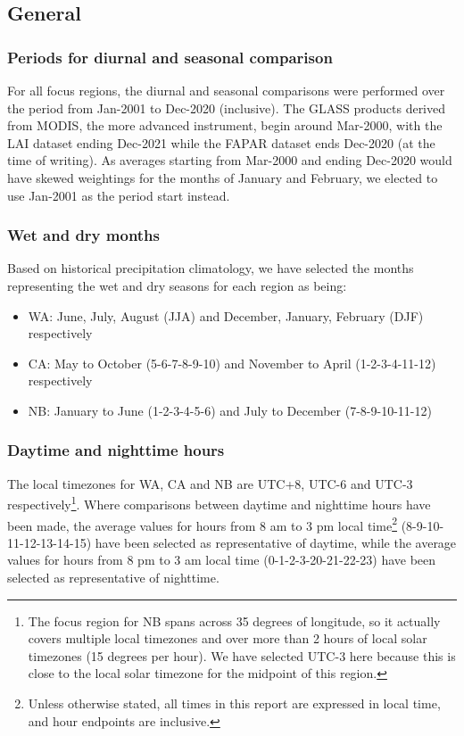 \subsection{General}

\subsubsection{Periods for diurnal and seasonal comparison}

For all focus regions, the diurnal and seasonal comparisons were performed over the period from Jan-2001 to Dec-2020 (inclusive). The GLASS products derived from \ac{MODIS}, the more advanced instrument, begin around Mar-2000, with the \ac{LAI} dataset ending Dec-2021 while the \ac{FAPAR} dataset ends Dec-2020 (at the time of writing). As averages starting from Mar-2000 and ending Dec-2020 would have skewed weightings for the months of January and February, we elected to use Jan-2001 as the period start instead.

\subsubsection{Wet and dry months}

Based on historical precipitation climatology, we have selected the months representing the wet and dry seasons for each region as being:
\begin{itemize}
	\item \ac{WA}: June, July, August (JJA) and December, January, February (DJF) respectively
	\item \ac{CA}: May to October (5-6-7-8-9-10) and November to April (1-2-3-4-11-12) respectively
	\item \ac{NB}: January to June (1-2-3-4-5-6) and July to December (7-8-9-10-11-12)
\end{itemize}

\subsubsection{Daytime and nighttime hours}

The local timezones for \ac{WA}, \ac{CA} and \ac{NB} are UTC+8, UTC-6 and UTC-3 respectively\footnote{The focus region for \ac{NB} spans across 35 degrees of longitude, so it actually covers multiple local timezones and over more than 2 hours of local solar timezones (15 degrees per hour). We have selected UTC-3 here because this is close to the local solar timezone for the midpoint of this region.}. Where comparisons between daytime and nighttime hours have been made, the average values for hours from 8 am to 3 pm local time\footnote{Unless otherwise stated, all times in this report are expressed in local time, and hour endpoints are inclusive.} (8-9-10-11-12-13-14-15) have been selected as representative of daytime, while the average values for hours from 8 pm to 3 am local time (0-1-2-3-20-21-22-23) have been selected as representative of nighttime.

